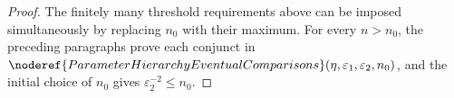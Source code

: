\begin{proof}
The finitely many threshold requirements above can be imposed simultaneously
by replacing \(n_0\) with their maximum.  For every \(n>n_0\), the preceding
paragraphs prove each conjunct in
\(\noderef{ParameterHierarchyEventualComparisons}(\eta,\varepsilon_1,
\varepsilon_2,n_0)\), and the initial choice of \(n_0\) gives
\(\varepsilon_2^{-2}\le n_0\).
\end{proof}
